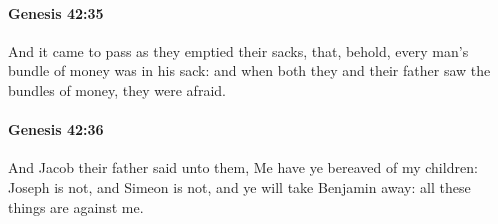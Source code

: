 		\paragraph{Genesis 42:35} %
			\label{GENESIS-42-35}

			And it came to pass as they emptied their sacks, that, behold, every man's bundle of money was in his sack: and when both they and their father saw the bundles of money, they were afraid.


		\paragraph{Genesis 42:36} %
			\label{GENESIS-42-36}

			And Jacob their father said unto them, Me have ye bereaved of my children: Joseph is not, and Simeon is not, and ye will take Benjamin away: all these things are against me.


